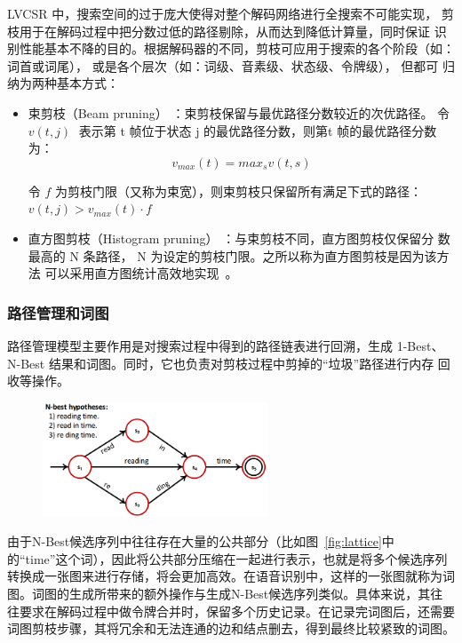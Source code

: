 LVCSR 中，搜索空间的过于庞大使得对整个解码网络进行全搜索不可能实现，
剪枝用于在解码过程中把分数过低的路径剔除，从而达到降低计算量，同时保证
识别性能基本不降的目的。根据解码器的不同，剪枝可应用于搜索的各个阶段（如：
词首或词尾）， 或是各个层次（如：词级、音素级、状态级、令牌级）， 但都可
归纳为两种基本方式：
\begin{itemize}
\item 束剪枝（Beam pruning） ：束剪枝保留与最优路径分数较近的次优路径。
令 $v(t,j)$ 表示第 t 帧位于状态 j 的最优路径分数，则第t 帧的最优路径分数为：
\begin{equation}
v_{max}(t)=max_s v(t,s)
\end{equation}

令 $f$ 为剪枝门限（又称为束宽），则束剪枝只保留所有满足下式的路径：
$v(t,j)>v_{max}(t)\cdot f$
\item 直方图剪枝（Histogram pruning） ：与束剪枝不同，直方图剪枝仅保留分
数最高的 N 条路径， N 为设定的剪枝门限。之所以称为直方图剪枝是因为该方法
可以采用直方图统计高效地实现~\cite{pylkkonen2005new}。
\end{itemize}

\subsubsection{路径管理和词图}

路径管理模型主要作用是对搜索过程中得到的路径链表进行回溯，生成 1-Best、
N-Best 结果和词图。同时，它也负责对剪枝过程中剪掉的“垃圾”路径进行内存
回收等操作。

\begin{figure}[!htp]
  \centering
    \captionstyle{\centering}
    \includegraphics[clip=true, width=0.6\textwidth]{figure/lattice.png}
\end{figure}


由于N-Best候选序列中往往存在大量的公共部分（比如图~\ref{fig:lattice}中的“time”这个词），因此将公共部分压缩在一起进行表示，也就是将多个候选序列转换成一张图来进行存储，将会更加高效。在语音识别中，这样的一张图就称为词图。词图的生成所带来的额外操作与生成N-Best候选序列类似。具体来说，其往往要求在解码过程中做令牌合并时，保留多个历史记录。在记录完词图后，还需要词图剪枝步骤，其将冗余和无法连通的边和结点删去，得到最终比较紧致的词图。

